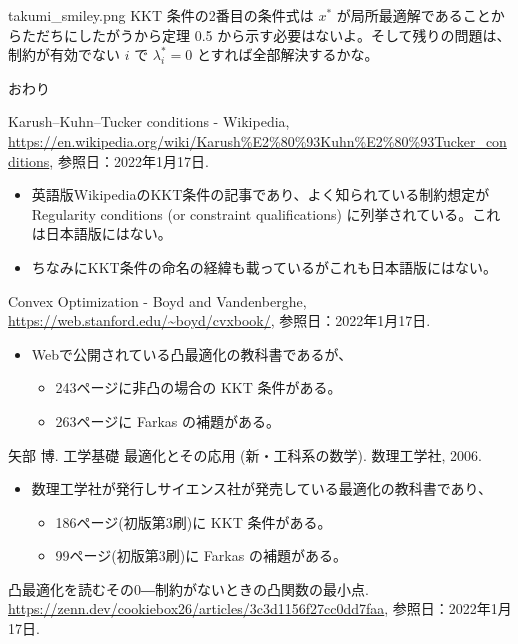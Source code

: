 \documentclass[b5paper,xelatex,ja=standard,10pt]{bxjsarticle}
\begin{document}
\begin{SERIFU}[colback=PaleGold, colbacktitle=PaleGold2]{takumi_smiley.png}
KKT 条件の2番目の条件式は $x^\ast$ が局所最適解であることからただちにしたがうから定理 0.5 から示す必要はないよ。そして残りの問題は、制約が有効でない $i$ で $\lambda_i^\ast = 0$ とすれば全部解決するかな。
\end{SERIFU}

\vspace{5pt}
\noindent おわり


\newpage
{}
\begin{thebibliography}{99}
     Karush–Kuhn–Tucker conditions - Wikipedia, \url{https://en.wikipedia.org/wiki/Karush%E2%80%93Kuhn%E2%80%93Tucker_conditions}, 参照日：2022年1月17日.
    \begin{itemize}
        \item 英語版WikipediaのKKT条件の記事であり、よく知られている制約想定が Regularity conditions (or constraint qualifications) に列挙されている。これは日本語版にはない。
        \item ちなみにKKT条件の命名の経緯も載っているがこれも日本語版にはない。
    \end{itemize}
     Convex Optimization - Boyd and Vandenberghe, \url{https://web.stanford.edu/~boyd/cvxbook/}, 参照日：2022年1月17日.
    \begin{itemize}
        \item Webで公開されている凸最適化の教科書であるが、
        \begin{itemize}
            \item 243ページに非凸の場合の KKT 条件がある。
            \item 263ページに Farkas の補題がある。
        \end{itemize}
    \end{itemize}
     矢部 博. 工学基礎 最適化とその応用 (新・工科系の数学). 数理工学社, 2006.
    \begin{itemize}
        \item 数理工学社が発行しサイエンス社が発売している最適化の教科書であり、
        \begin{itemize}
            \item 186ページ(初版第3刷)に KKT 条件がある。
            \item 99ページ(初版第3刷)に Farkas の補題がある。
        \end{itemize}
    \end{itemize}
     凸最適化を読むその0―制約がないときの凸関数の最小点. \url{https://zenn.dev/cookiebox26/articles/3c3d1156f27cc0dd7faa}, 参照日：2022年1月17日.

\end{thebibliography}
\end{document}

